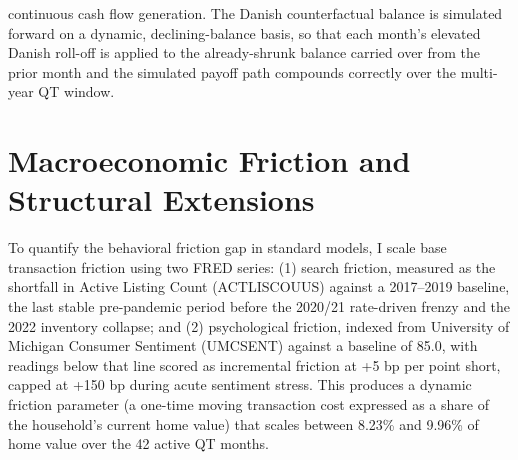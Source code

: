 \documentclass[12pt]{article}
\begin{document}
continuous cash flow generation. The Danish counterfactual balance is simulated forward on a dynamic, declining-balance basis, so that each month's elevated Danish roll-off is applied to the already-shrunk balance carried over from the prior month and the simulated payoff path compounds correctly over the multi-year QT window.

\section{Macroeconomic Friction and Structural Extensions}\label{sec:method-frictions}

To quantify the behavioral friction gap in standard models, I scale base transaction friction using two FRED series: (1) search friction, measured as the shortfall in Active Listing Count (ACTLISCOUUS) against a 2017--2019 baseline, the last stable pre-pandemic period before the 2020/21 rate-driven frenzy and the 2022 inventory collapse; and (2) psychological friction, indexed from University of Michigan Consumer Sentiment (UMCSENT) against a baseline of 85.0, with readings below that line scored as incremental friction at +5 bp per point short, capped at +150 bp during acute sentiment stress. This produces a dynamic friction parameter (a one-time moving transaction cost expressed as a share of the household's current home value) that scales between 8.23\% and 9.96\% of home value over the 42 active QT months.
\end{document}
